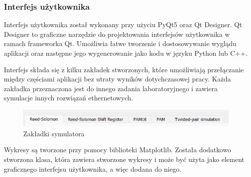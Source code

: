 \subsubsection{Interfejs użytkownika}
Interfejs użytkownika został wykonany przy użyciu PyQt5 oraz Qt Designer. Qt Designer to graficzne narzędzie do projektowania interfejsów użytkownika w ramach frameworka Qt. Umożliwia łatwe tworzenie i dostosowywanie wyglądu aplikacji oraz następne jego wygenerowanie jako kodu w języku Python lub C++.

Interfejs składa się z kilku zakładek stworzonych, które umożliwiają przełączanie między częściami aplikacji bez utraty wyników dotychczasowej pracy. Każda zakładka przeznaczona jest do innego zadania laboratoryjnego i zawiera symulacje innych rozwiązań ethernetowych. 

\begin{figure}[ht]
    \centering
    \includegraphics{images/zakladki.png}
    \caption{Zakładki symulatora}
    \label{fig:zakladki_image}
\end{figure}

Wykresy są tworzone przy pomocy biblioteki Matplotlib. Została dodatkowo stworzona klasa, która zawiera stworzone wykresy i może być użyta jako element graficznego interfejsu użytkownika, a więc dodana do niego.


